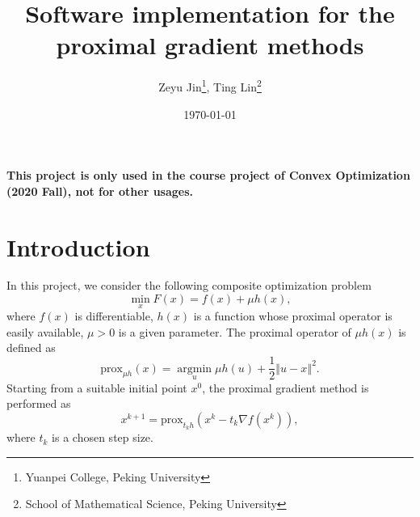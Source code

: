 \documentclass[a4paper]{article}
\title{Software implementation for the proximal gradient methods}
\author{Zeyu Jin\thanks{Yuanpei College, Peking University}, Ting Lin\thanks{School of Mathematical Science, Peking University}}
\date{\today}
\newcommand{\norm}[1]{\left\Vert#1\right\Vert}
\newcommand{\prox}{\mathrm{prox}}
\begin{document}
  \maketitle  
  \textbf{\color{red} This project is only used in the course project of Convex Optimization (2020 Fall), not for other usages.}
  \tableofcontents


  \section{Introduction}
  \label{sec:intro}
  In this project, we consider the following composite optimization 
  problem
  \begin{equation}
    \min\limits_{x} F(x) = f(x) + \mu h(x),
  \end{equation}
  where $f(x)$ is differentiable, $h(x)$ is a function whose 
  proximal operator is easily available, $\mu > 0$ is a given 
  parameter.
  The proximal operator of $\mu h(x)$ is defined as
  \begin{displaymath}
    \prox_{\mu h}(x) = \mathop{\arg\min}\limits_{u} \mu h(u) + 
    \frac{1}{2} \norm{u - x}^2.
  \end{displaymath}
  Starting from a suitable initial point $x^0$, the proximal gradient 
  method is performed as
  \begin{equation}\label{equ:pg}
    x^{k+1} = \prox_{t_k h} (x^k - t_k \nabla f(x^k)),
  \end{equation}
  where $t_k$ is a chosen step size.
  
\end{document}
